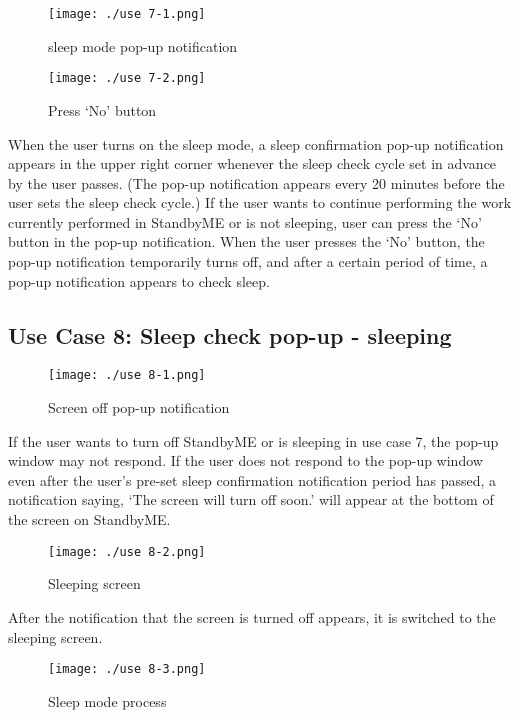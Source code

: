 \documentclass[conference]{IEEEtran}
\begin{document}
\begin{figure}[H]
\texttt{[image: ./use 7-1.png]}
\centering
\caption{sleep mode pop-up notification}
\end{figure}

\begin{figure}[H]
\texttt{[image: ./use 7-2.png]}
\centering
\caption{Press ‘No’ button}
\end{figure}

When the user turns on the sleep mode, a sleep confirmation pop-up notification appears in the upper right corner whenever the sleep check cycle set in advance by the user passes. (The pop-up notification appears every 20 minutes before the user sets the sleep check cycle.) If the user wants to continue performing the work currently performed in StandbyME or is not sleeping, user can press the ‘No' button in the pop-up notification. When the user presses the ‘No' button, the pop-up notification temporarily turns off, and after a certain period of time, a pop-up notification appears to check sleep.

\subsection{Use Case 8: Sleep check pop-up - sleeping}

\begin{figure}[H]
\texttt{[image: ./use 8-1.png]}
\centering
\caption{Screen off pop-up notification}
\end{figure}

If the user wants to turn off StandbyME or is sleeping in use case 7, the pop-up window may not respond. If the user does not respond to the pop-up window even after the user's pre-set sleep confirmation notification period has passed, a notification saying, ‘The screen will turn off soon.' will appear at the bottom of the screen on StandbyME.

\begin{figure}[H]
\texttt{[image: ./use 8-2.png]}
\centering
\caption{Sleeping screen}
\end{figure}

After the notification that the screen is turned off appears, it is switched to the sleeping screen.

\begin{figure}[H]
\texttt{[image: ./use 8-3.png]}
\centering
\caption{Sleep mode process}
\end{figure}
\end{document}
